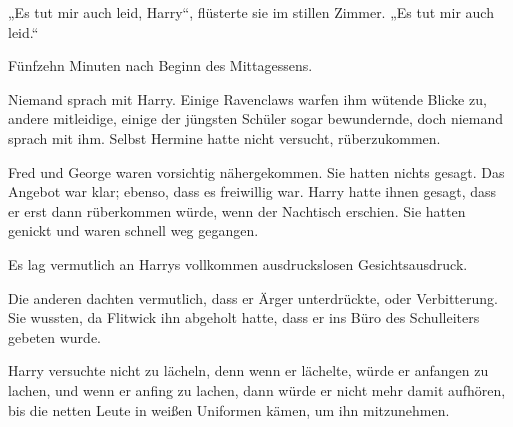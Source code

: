 „Es tut mir auch leid, Harry“, flüsterte sie im stillen Zimmer.
„Es tut mir auch leid.“

\later

Fünfzehn Minuten nach Beginn des Mittagessens.

Niemand sprach mit Harry. Einige Ravenclaws warfen ihm wütende Blicke zu, andere mitleidige, einige der jüngsten Schüler sogar bewundernde, doch niemand sprach mit ihm. Selbst Hermine hatte nicht versucht, rüberzukommen.

Fred und George waren vorsichtig nähergekommen. Sie hatten nichts gesagt. Das Angebot war klar; ebenso, dass es freiwillig war. Harry hatte ihnen gesagt, dass er erst dann rüberkommen würde, wenn der Nachtisch erschien. Sie hatten genickt und waren schnell weg gegangen.

Es lag vermutlich an Harrys vollkommen ausdruckslosen Gesichtsausdruck.

Die anderen dachten vermutlich, dass er Ärger unterdrückte, oder Verbitterung. Sie wussten, da Flitwick ihn abgeholt hatte, dass er ins Büro des Schulleiters gebeten wurde.

Harry versuchte nicht zu lächeln, denn wenn er lächelte, würde er anfangen zu lachen, und wenn er anfing zu lachen, dann würde er nicht mehr damit aufhören, bis die netten Leute in weißen Uniformen kämen, um ihn mitzunehmen.

